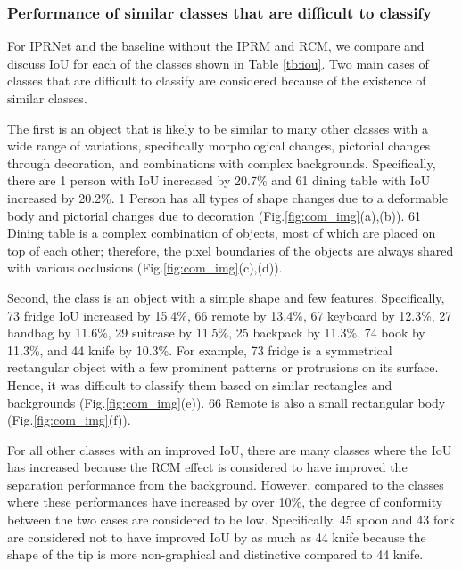 \documentclass[runningheads]{llncs}
\begin{document}
\subsubsection{Performance of similar classes that are difficult to classify}
For IPRNet and the baseline without the IPRM and RCM, we compare and discuss IoU for each of the classes shown in Table \ref{tb:iou}.
Two main cases of classes that are difficult to classify are considered because of the existence of similar classes.

The first is an object that is likely to be similar to many other classes with a wide range of variations, specifically morphological changes, pictorial changes through decoration, and combinations with complex backgrounds.
Specifically, there are 1 person with IoU increased by 20.7\% and 61 dining table with IoU increased by 20.2\%.
1 Person has all types of shape changes due to a deformable body and pictorial changes due to decoration (Fig.\ref{fig:com_img}(a),(b)).
61 Dining table is a complex combination of objects, most of which are placed on top of each other; therefore, the pixel boundaries of the objects are always shared with various occlusions (Fig.\ref{fig:com_img}(c),(d)).

Second, the class is an object with a simple shape and few features.
Specifically, 73 fridge IoU increased by 15.4\%, 66 remote by 13.4\%, 67 keyboard by 12.3\%, 27 handbag by 11.6\%, 29 suitcase by 11.5\%, 25 backpack by 11.3\%, 74 book by 11.3\%, and 44 knife by 10.3\%.
For example, 73 fridge is a symmetrical rectangular object with a few prominent patterns or protrusions on its surface. Hence, it was difficult to classify them based on similar rectangles and backgrounds (Fig.\ref{fig:com_img}(e)).
66 Remote is also a small rectangular body (Fig.\ref{fig:com_img}(f)). 

For all other classes with an improved IoU, there are many classes where the IoU has increased because the RCM effect is considered to have improved the separation performance from the background.
However, compared to the classes where these performances have increased by over 10\%, the degree of conformity between the two cases are considered to be low.
Specifically, 45 spoon and 43 fork are considered not to have improved IoU by as much as 44 knife because the shape of the tip is more non-graphical and distinctive compared to 44 knife.
\end{document}
